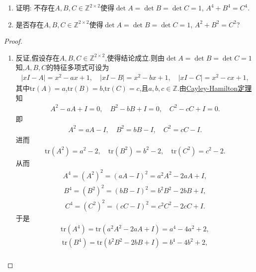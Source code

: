 \documentclass[../../main.tex]{subfiles}%
\begin{document}
\begin{example}
\begin{enumerate}[(1)]
\item 证明: 不存在$A,B,C \in \mathbb{Z}^{2 \times 2}$使得$\det A = \det B = \det C = 1$, $A^4 + B^4 = C^4$.

\item 是否存在$A,B,C \in \mathbb{Z}^{2 \times 2}$使得$\det A = \det B = \det C = 1$, $A^2 + B^2 = C^2$?
\end{enumerate}
\end{example}
\begin{proof}
\begin{enumerate}[(1)]
\item 反证,假设存在$A,B,C\in \mathbb{Z}^{2 \times 2}$,使得结论成立.则由$\det A = \det B = \det C = 1$知,$A,B,C$的特征多项式可设为
\begin{align*}
|xI - A| = x^2 - ax + 1, \quad |xI - B| = x^2 - bx + 1, \quad |xI - C| = x^2 - cx + 1,
\end{align*}
其中$\mathrm{tr}(A) = a$,$\mathrm{tr}(B) = b$,$\mathrm{tr}(C) = c$,且$a,b,c\in \mathbb{Z}$.由\hyperref[theorem:Cayley-Hamilton定理]{Cayley-Hamilton定理}知
\begin{align*}
A^2 - aA + I = 0, \quad B^2 - bB + I = 0, \quad C^2 - cC + I = 0.
\end{align*}
即
\begin{align*}
A^2 = aA - I, \quad B^2 = bB - I, \quad C^2 = cC - I.
\end{align*}
进而
\begin{align*}
\mathrm{tr}(A^2) = a^2 - 2, \quad \mathrm{tr}(B^2) = b^2 - 2, \quad \mathrm{tr}(C^2) = c^2 - 2.
\end{align*}
从而
\begin{align*}
A^4 = (A^2)^2 = (aA - I)^2 = a^2A^2 - 2aA + I,
\end{align*}
\begin{align*}
B^4 = (B^2)^2 = (bB - I)^2 = b^2B^2 - 2bB + I,
\end{align*}
\begin{align*}
C^4 = (C^2)^2 = (cC - I)^2 = c^2C^2 - 2cC + I.
\end{align*}
于是
\begin{align*}
\mathrm{tr}(A^4) = \mathrm{tr}(a^2A^2 - 2aA + I) = a^4 - 4a^2 + 2,
\end{align*}
\begin{align*}
\mathrm{tr}(B^4) = \mathrm{tr}(b^2B^2 - 2bB + I) = b^4 - 4b^2 + 2,
\end{align*}
\begin{align*}

\end{align*}
\end{enumerate}
\end{proof}
\end{document}
